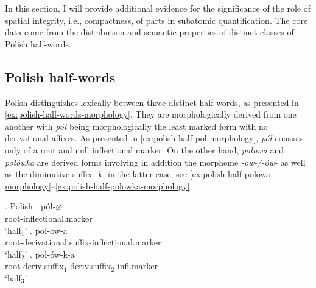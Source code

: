 In this section, I will provide additional evidence for the significance of the role of spatial integrity, i.e., compactness, of parts in subatomic quantification. The core data come from the distribution and semantic properties of distinct classes of Polish half-words.

\subsection{Polish half-words}\label{sec:polish-half-words}

Polish distinguishes lexically between three distinct half-words, as presented in \ref{ex:polish-half-words-morphology}. They are morphologically derived from one another with \textit{pół} being morphologically the least marked form with no derivational affixes. As presented in \ref{ex:polish-half-pol-morphology}, \textit{pół} consists only of a root and null inflectional marker. On the other hand, \textit{połowa} and \textit{połówka} are derived forms involving in addition the morpheme \textit{-ow-/-ów-} as well as the diminutive suffix \textit{-k-} in the latter case, see \ref{ex:polish-half-polowa-morphology}--\ref{ex:polish-half-polowka-morphology}.

		\ex. Polish\label{ex:polish-half-words-morphology}
        \ag. pół-$\varnothing$\\
		root-inflectional.marker\\
		`half$_1$'\label{ex:polish-half-pol-morphology}
		\bg. poł-ow-a\\
		root-derivational.suffix-inflectional.marker\\
		`half$_2$'\label{ex:polish-half-polowa-morphology}
        \bg. poł-ów-k-a\\
		root-deriv.suffix$_1$-deriv.suffix$_2$-infl.marker\\
		`half$_3$'\label{ex:polish-half-polowka-morphology}

